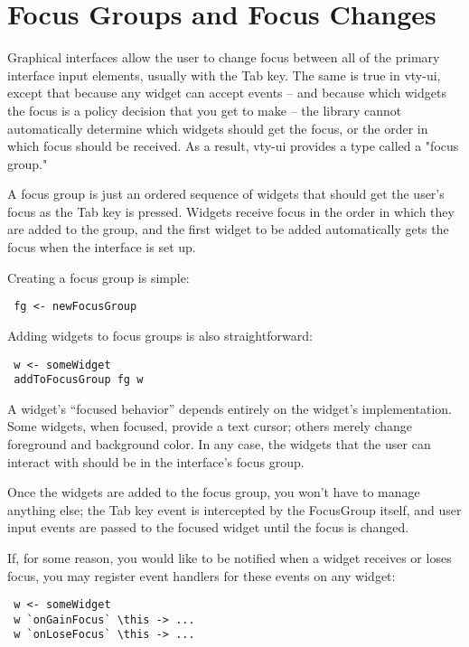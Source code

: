 \section{Focus Groups and Focus Changes}
\label{sec:focus}

Graphical interfaces allow the user to change focus between all of the
primary interface input elements, usually with the Tab key.  The same is
true in vty-ui, except that because any widget can accept events -- and
because which widgets the focus is a policy decision that you get to
make -- the library cannot automatically determine which widgets should
get the focus, or the order in which focus should be received.  As a
result, vty-ui provides a type called a "focus group."

A focus group is just an ordered sequence of widgets that should get the
user's focus as the Tab key is pressed.  Widgets receive focus in the
order in which they are added to the group, and the first widget to be
added automatically gets the focus when the interface is set up.

Creating a focus group is simple:

\begin{verbatim}
 fg <- newFocusGroup
\end{verbatim}

Adding widgets to focus groups is also straightforward:

\begin{verbatim}
 w <- someWidget
 addToFocusGroup fg w
\end{verbatim}

A widget's ``focused behavior'' depends entirely on the widget's
implementation.  Some widgets, when focused, provide a text cursor;
others merely change foreground and background color.  In any case,
the widgets that the user can interact with should be in the
interface's focus group.

Once the widgets are added to the focus group, you won't have to manage
anything else; the Tab key event is intercepted by the FocusGroup
itself, and user input events are passed to the focused widget until the
focus is changed.

If, for some reason, you would like to be notified when a widget
receives or loses focus, you may register event handlers for these
events on any widget:

\begin{verbatim}
 w <- someWidget
 w `onGainFocus` \this -> ...
 w `onLoseFocus` \this -> ...
\end{verbatim}

